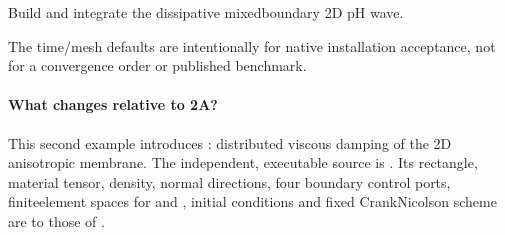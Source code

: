 \documentclass[letterpaper,10pt,english]{sphinxmanual}
\begin{document}
\begin{fulllineitems}
\label{\detokenize{examples/wave:examples.wave_dissipative.wave_eq}}
\pysigstartsignatures
\pysiglinewithargsret
{}
{\sphinxparamcomma {}\sphinxparamcomma {}\sphinxparamcomma {}\sphinxparamcomma {}\sphinxparamcomma {}}
{}
\pysigstopsignatures
\sphinxAtStartPar
Build and integrate the dissipative mixed\sphinxhyphen{}boundary 2D pH wave.

\sphinxAtStartPar
The time/mesh defaults are intentionally for native installation
acceptance, not for a convergence order or published benchmark.

\end{fulllineitems}



\paragraph{What changes relative to 2A?}
\label{\detokenize{examples/wave:what-changes-relative-to-2a}}
\sphinxAtStartPar
This second example introduces :
distributed viscous damping of the 2D anisotropic membrane.
The independent, executable source is
. Its rectangle,
material tensor, density, normal directions, four boundary
control ports, finite\sphinxhyphen{}element spaces for  and ,
initial conditions and fixed Crank\textendash{}Nicolson scheme
are  to those of {\hyperref[\detokenize{examples/wave::doc}]{}}.
\end{document}
